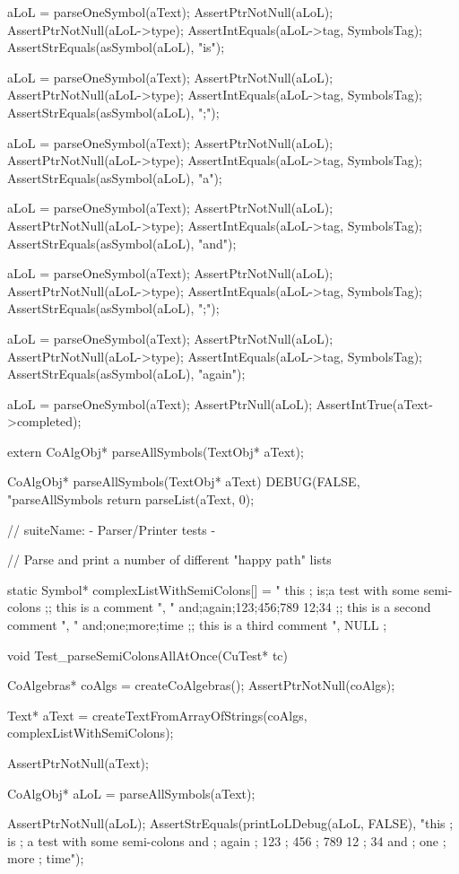   aLoL = parseOneSymbol(aText);
  AssertPtrNotNull(aLoL);
  AssertPtrNotNull(aLoL->type);
  AssertIntEquals(aLoL->tag, SymbolsTag);
  AssertStrEquals(asSymbol(aLoL), "is");

  aLoL = parseOneSymbol(aText);
  AssertPtrNotNull(aLoL);
  AssertPtrNotNull(aLoL->type);
  AssertIntEquals(aLoL->tag, SymbolsTag);
  AssertStrEquals(asSymbol(aLoL), ";");

  aLoL = parseOneSymbol(aText);
  AssertPtrNotNull(aLoL);
  AssertPtrNotNull(aLoL->type);
  AssertIntEquals(aLoL->tag, SymbolsTag);
  AssertStrEquals(asSymbol(aLoL), "a");

  aLoL = parseOneSymbol(aText);
  AssertPtrNotNull(aLoL);
  AssertPtrNotNull(aLoL->type);
  AssertIntEquals(aLoL->tag, SymbolsTag);
  AssertStrEquals(asSymbol(aLoL), "and");

  aLoL = parseOneSymbol(aText);
  AssertPtrNotNull(aLoL);
  AssertPtrNotNull(aLoL->type);
  AssertIntEquals(aLoL->tag, SymbolsTag);
  AssertStrEquals(asSymbol(aLoL), ";");

  aLoL = parseOneSymbol(aText);
  AssertPtrNotNull(aLoL);
  AssertPtrNotNull(aLoL->type);
  AssertIntEquals(aLoL->tag, SymbolsTag);
  AssertStrEquals(asSymbol(aLoL), "again");

  aLoL = parseOneSymbol(aText);
  AssertPtrNull(aLoL);
  AssertIntTrue(aText->completed);
\stopCTest
\stopTestCase
\stopTestSuite

\startCHeader
extern CoAlgObj* parseAllSymbols(TextObj* aText);
\stopCHeader

\startCCode
CoAlgObj* parseAllSymbols(TextObj* aText) {
  DEBUG(FALSE, "parseAllSymbols %
  return parseList(aText, 0);
}
\stopCCode


\starttyping

// suiteName: - Parser/Printer tests -



// Parse and print a number of different "happy path" lists

static Symbol* complexListWithSemiColons[] = {
  " this ; is;a test with some semi-colons ;; this is a comment ",
  " and;again;123;456;789 12;34 ;; this is a second comment ",
  " and;one;more;time ;; this is a third comment ",
  NULL
};

void Test_parseSemiColonsAllAtOnce(CuTest* tc) {
  CoAlgebras* coAlgs = createCoAlgebras();
  AssertPtrNotNull(coAlgs);

  Text* aText =
    createTextFromArrayOfStrings(coAlgs, complexListWithSemiColons);

  AssertPtrNotNull(aText);

  CoAlgObj* aLoL = parseAllSymbols(aText);

  AssertPtrNotNull(aLoL);
  AssertStrEquals(printLoLDebug(aLoL, FALSE),
    "this ; is ; a test with some semi-colons and ; again ; 123 ; 456 ; 789 12 ; 34 and ; one ; more ; time");
}

